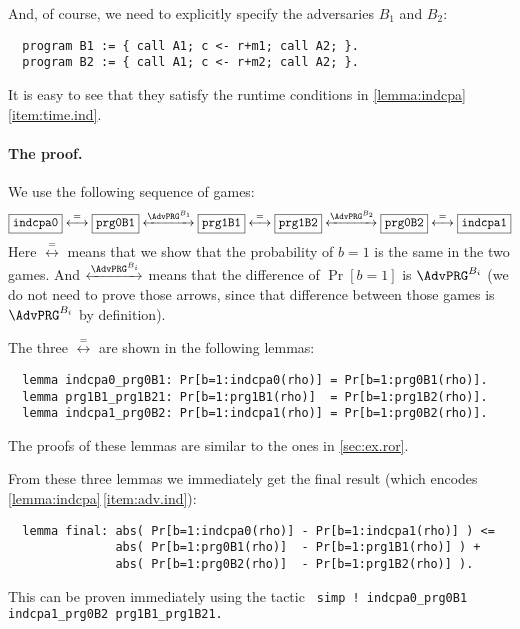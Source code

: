 \documentclass{article}
\begin{document}
And, of course, we need to explicitly specify the adversaries $B_1$ and $B_2$:
\begin{lstlisting}
  program B1 := { call A1; c <- r+m1; call A2; }.
  program B2 := { call A1; c <- r+m2; call A2; }.
\end{lstlisting}
It is easy to see that they satisfy the runtime conditions in
\autoref{lemma:indcpa}\,\eqref{item:time.ind}.


\paragraph{The proof.}
We use the following sequence of games:
\begin{equation*}
  \framebox{\texttt{indcpa0}}
  \overset=\longleftrightarrow
  \framebox{\texttt{prg0B1}}
  \xleftrightarrow{\AdvPRG^{B_1}}
  \framebox{\texttt{prg1B1}}
  \overset=\longleftrightarrow
  \framebox{\texttt{prg1B2}}
  \xleftrightarrow{\AdvPRG^{B_2}}
  \framebox{\texttt{prg0B2}}
  \overset=\longleftrightarrow
  \framebox{\texttt{indcpa1}}
\end{equation*}
Here $\overset=\longleftrightarrow$
means that we show that the probability of $b=1$
is the same in the two games. And $\xleftrightarrow{\AdvPRG^{B_i}}$
means that the difference of $\Pr[b=1]$
is $\AdvPRG^{B_i}$
(we do not need to prove those arrows, since that difference between those games is  $\AdvPRG^{B_i}$ by definition).

The three $\overset=\longleftrightarrow$ are shown in the following lemmas:
\begin{lstlisting}
  lemma indcpa0_prg0B1: Pr[b=1:indcpa0(rho)] = Pr[b=1:prg0B1(rho)].
  lemma prg1B1_prg1B21: Pr[b=1:prg1B1(rho)]  = Pr[b=1:prg1B2(rho)].
  lemma indcpa1_prg0B2: Pr[b=1:indcpa1(rho)] = Pr[b=1:prg0B2(rho)].
\end{lstlisting}
The proofs of these lemmas are similar to the ones in \autoref{sec:ex.ror}.

From these three lemmas we immediately get the final result (which
encodes \autoref{lemma:indcpa}\,\eqref{item:adv.ind}):
\begin{lstlisting}
  lemma final: abs( Pr[b=1:indcpa0(rho)] - Pr[b=1:indcpa1(rho)] ) <=
               abs( Pr[b=1:prg0B1(rho)]  - Pr[b=1:prg1B1(rho)] ) +
               abs( Pr[b=1:prg0B2(rho)]  - Pr[b=1:prg1B2(rho)] ).
\end{lstlisting}
This can be proven immediately using the tactic \texttt{\frenchspacing
  simp !  indcpa0\_prg0B1 indcpa1\_prg0B2 prg1B1\_prg1B21.}
\end{document}
